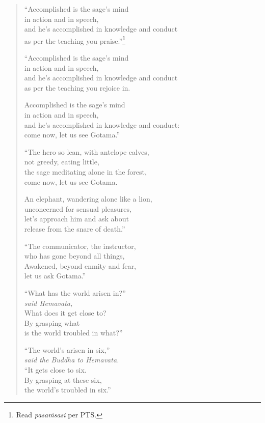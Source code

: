\documentclass[12pt,openany]{book}%
\newcommand*{\scspeaker}[1]{\hspace{2em}\textit{#1}}
\begin{document}
\begin{verse}
“Accomplished is the sage’s mind \\
in action and in speech, \\
and he’s accomplished in knowledge and conduct \\
as per the teaching you praise.”\footnote{Read \textit{\textsanskrit{pasaṁsasi}} per PTS. } 

“Accomplished is the sage’s mind \\
in action and in speech, \\
and he’s accomplished in knowledge and conduct \\
as per the teaching you rejoice in. 

Accomplished is the sage’s mind \\
in action and in speech, \\
and he’s accomplished in knowledge and conduct: \\
come now, let us see Gotama.” 

“The hero so lean, with antelope calves, \\
not greedy, eating little, \\
the sage meditating alone in the forest, \\
come now, let us see Gotama. 

An elephant, wandering alone like a lion, \\
unconcerned for sensual pleasures, \\
let’s approach him and ask about \\
release from the snare of death.” 

“The communicator, the instructor, \\
who has gone beyond all things, \\
Awakened, beyond enmity and fear, \\
let us ask Gotama.” 

“What has the world arisen in?” \\
\scspeaker{said Hemavata, }\\
What does it get close to? \\
By grasping what \\
is the world troubled in what?” 

“The world’s arisen in six,” \\
\scspeaker{said the Buddha to Hemavata. }\\
“It gets close to six. \\
By grasping at these six, \\
the world’s troubled in six.” 


\end{verse}
\end{document}
